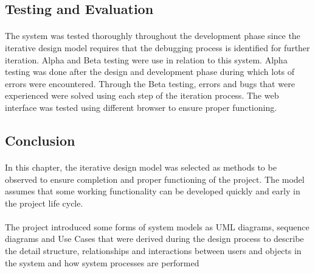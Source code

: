\documentclass[12pt]{article}
\begin{document}
\subsection*{Testing and Evaluation}
\paragraph*{}
The system was tested thoroughly throughout the development phase since the iterative design model requires that the debugging process is identified for further iteration. Alpha and Beta testing were use in relation to this system. Alpha testing was done after the design and development phase during which lots of errors were encountered. Through the Beta testing, errors and bugs that were experienced were solved using each step of the iteration process. The web interface was tested using different browser to ensure proper functioning.

\subsection*{Conclusion}
\paragraph*{}
In this chapter, the iterative design model was selected as methods to be observed to ensure completion and proper functioning of the project. The model assumes that some working functionality can be developed quickly and early in the project life cycle.
\paragraph*{}
	The project introduced some forms of system models as UML diagrams, sequence diagrams and Use Cases that were derived during the design process to describe the detail structure, relationships and interactions between users and objects in the system and how system processes are performed

			
			
			
		



	
\end{document}
